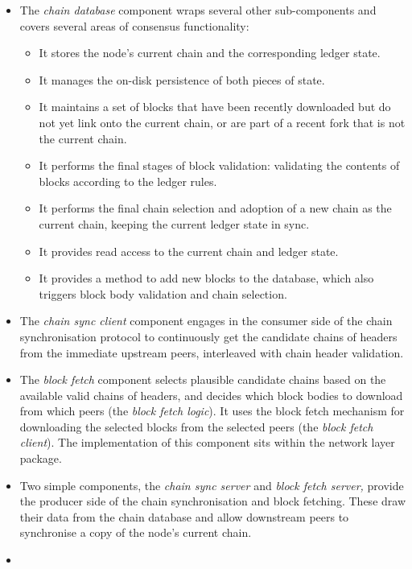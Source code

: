 \documentclass[11pt,a4paper]{article}
\begin{document}
\begin{itemize}
\item
  The \emph{chain database} component wraps several other sub-components
  and covers several areas of consensus functionality:

  \begin{itemize}
  \item
    It stores the node's current chain and the corresponding ledger
    state.
  \item
    It manages the on-disk persistence of both pieces of state.
  \item
    It maintains a set of blocks that have been recently downloaded but
    do not yet link onto the current chain, or are part of a recent fork
    that is not the current chain.
  \item
    It performs the final stages of block validation: validating the
    contents of blocks according to the ledger rules.
  \item
    It performs the final chain selection and adoption of a new chain as
    the current chain, keeping the current ledger state in sync.
  \item
    It provides read access to the current chain and ledger state.
  \item
    It provides a method to add new blocks to the database, which also
    triggers block body validation and chain selection.
  \end{itemize}
\item
  The \emph{chain sync client} component engages in the consumer side of
  the chain synchronisation protocol to continuously get the candidate
  chains of headers from the immediate upstream peers, interleaved with
  chain header validation.
\item
  The \emph{block fetch} component selects plausible candidate chains
  based on the available valid chains of headers, and decides which
  block bodies to download from which peers (the \emph{block fetch
  logic}). It uses the block fetch mechanism for downloading the
  selected blocks from the selected peers (the \emph{block fetch
  client}). The implementation of this component sits within the network
  layer package.
\item
  Two simple components, the \emph{chain sync server} and \emph{block
  fetch server,} provide the producer side of the chain synchronisation
  and block fetching. These draw their data from the chain database and
  allow downstream peers to synchronise a copy of the node's current
  chain.
\item

\end{itemize}
\end{document}
